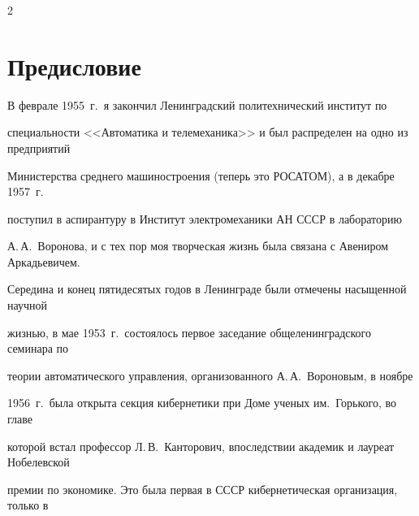 









      \thispagestyle{headings}





      \begin{multicols}{2}


      


            \label{st\stat}





\section*{Предисловие}


      


      В феврале 1955~г.\ я закончил Ленинградский политехнический институт по 


специальности <<Автоматика и телемеханика>> и был распределен на одно из предприятий 


Министерства среднего машиностроения (теперь это РОСАТОМ), а в декабре 1957~г.\ 


поступил в аспирантуру в Институт электромеханики АН СССР в лабораторию 


А.\,А.~Воронова, и с тех пор моя творческая жизнь была связана с Авениром Аркадьевичем. 


Середина и конец пятидесятых годов в Ленинграде были отмечены насыщенной научной 


жизнью, в мае 1953~г.\ состоялось первое заседание общеленинградского семинара по 


теории автоматического управ\-ле\-ния, организованного А.\,А.~Вороновым, в ноябре 


1956~г.\ была открыта секция кибернетики при Доме ученых им.\ Горького, во главе 


которой встал профессор Л.\,В.~Канторович, впоследствии академик и лауреат Нобелевской 


премии по экономике. Это была первая в СССР кибернетическая организация, только в 



\end{multicols}

